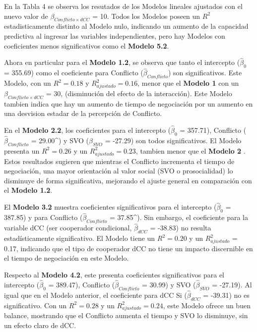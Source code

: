 \documentclass[
  spanish,
  10pt,
]{article}
\begin{document}
En la Tabla 4 se observa los resutados de los Modelos lineales ajustados
con el nuevo valor de \(\beta_{Conflicto \times dCC}\) = 10. Todos los
Modelos poseen un \(R^2\) estadisticamente distinto al Modelo nulo,
indicando un aumento de la capacidad predictiva al ingresar las
variables independientes, pero hay Modelos con coeficientes menos
significativos como el \textbf{Modelo 5.2}.

Ahora en particular para el \textbf{Modelo 1.2}, se observa que tanto el
intercepto (\(\hat{\beta}_{0}\) = 355.69) como el coeficiente para
Conflicto (\(\hat{\beta}_{Conflicto}\)) son significativos. Este Modelo,
con un \(R^2 = 0.18\) y \(R^2_{ajustado} = 0.16\), menor que el
\textbf{Modelo 1} con un \(\beta_{Conflicto \times dCC}\) = 30,
(disminución del efecto de la interacción). Este Modelo tambien indica
que hay un aumento de tiempo de negociación por un aumento en una
desvision estadar de la percepción de Conflicto.

En el \textbf{Modelo 2.2}, los coeficientes para el intercepto
(\(\hat{\beta}_{0}\) = 357.71), Conflicto (\(\hat{\beta}_{Conflicto}\) =
29.00\^{}) y SVO (\(\hat{\beta}_{SVO}\) = -27.29) son todos
significativos. El Modelo presenta un \(R^2 = 0.26\) y un
\(R^2_{ajustado} = 0.23\), tambien menor que el \textbf{Modelo 2} .
Estos resultados sugieren que mientras el Conflicto incrementa el tiempo
de negociación, una mayor orientación al valor social (SVO o
prosocialidad) lo disminuye de forma significativa, mejorando el ajuste
general en comparación con el \textbf{Modelo 1.2}.

El \textbf{Modelo 3.2} muestra coeficientes significativos para el
intercepto (\(\hat{\beta}_{0}\) = 387.85) y para Conflicto
(\(\hat{\beta}_{Conflicto}\) = 37.85\^{}). Sin embargo, el coeficiente
para la variable dCC (ser cooperador condicional, \(\hat{\beta}_{dCC}\)
= -38.83) no resulta estadísticamente significativo. El Modelo tiene un
\(R^2 = 0.20\) y un \(R^2_{ajustado}\) = 0.17, indicando que el tipo de
cooperador dCC no tiene un impacto discernible en el tiempo de
negociación en este Modelo.

Respecto al \textbf{Modelo 4.2}, este presenta coeficientes
significativos para el intercepto (\(\hat{\beta}_{0}\) = 389.47),
Conflicto (\(\hat{\beta}_{Conflicto}\) = 30.99) y SVO
(\(\hat{\beta}_{SVO}\) = -27.19). Al igual que en el Modelo anterior, el
coeficiente para dCC Si (\(\hat{\beta}_{dCC}\) = -39.31) no es
significativo. Con un \(R^2 = 0.28\) y un \(R^2_{ajustado} = 0.24\),
este Modelo ofrece un buen balance, mostrando que el Conflicto aumenta
el tiempo y SVO lo disminuye, sin un efecto claro de dCC.
\end{document}
